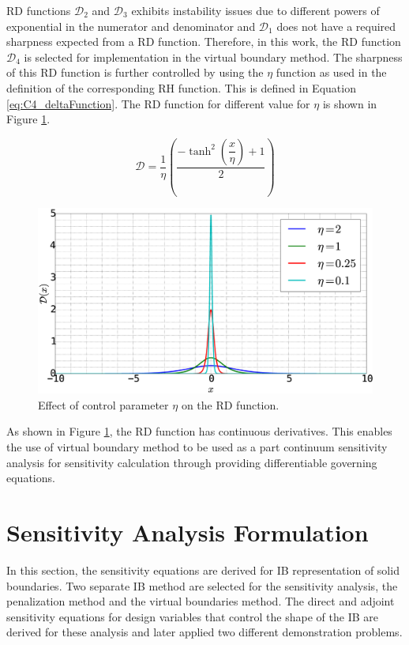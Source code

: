RD functions $\mathcal{D}_2$ and $\mathcal{D}_3$ exhibits instability issues due to different powers of exponential in the numerator and denominator and $\mathcal{D}_1$ does not have a required sharpness expected from a RD function. Therefore, in this work, the RD function $\mathcal{D}_4$ is selected for implementation in the virtual boundary method. The sharpness of this RD function is further controlled by using the $\eta$ function as used in the definition of the corresponding RH function. This is defined in Equation \eqref{eq:C4_deltaFunction}. The RD function for different value for $\eta$ is shown in Figure \ref{fig:C4_deltaFunctionWithControlParamter}.

\begin{equation}\label{eq:C4_deltaFunction}
	\mathcal{D} = \dfrac{1}{\eta} \left( \dfrac{-\tanh^{2}{\left (\dfrac{x}{\eta} \right )} + 1}{2} \right)
\end{equation}

\begin{figure}[H]
	\centering
	\includegraphics[width=12.00cm]{Chapter_4/figure/delta_function_with_control.eps}
	\caption{Effect of control parameter $\eta$ on the RD function.}
	\label{fig:C4_deltaFunctionWithControlParamter}
\end{figure}

As shown in Figure \ref{fig:C4_deltaFunctionWithControlParamter}, the RD function has continuous derivatives. This enables the use of virtual boundary method to be used as a part continuum sensitivity analysis for sensitivity calculation through providing differentiable governing equations.

\section{Sensitivity Analysis Formulation}
In this section, the sensitivity equations are derived for IB representation of solid boundaries. Two separate IB method are selected for the sensitivity analysis, the penalization method and the virtual boundaries method. The direct and adjoint sensitivity equations for design variables that control the shape of the IB are derived for these analysis and later applied two different demonstration problems. 

